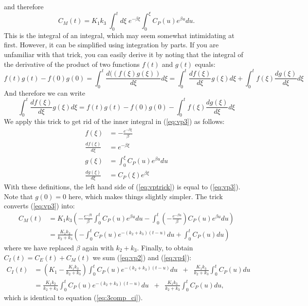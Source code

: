 \documentclass[11pt,oneside]{article}
\begin{document}
and therefore
\begin{equation}
  C_M(t) = K_1 k_3 \; \int_0^t d\xi \; e^{-\beta \xi} 
       \int_0^\xi  C_P(u) e^{\beta u} du.   \label{eq:vp3}
\end{equation}
This is the integral of an integral, which may seem somewhat
intimidating at first. However, it can be simplified using integration
by parts. If you are unfamiliar with that trick, you can easily derive
it by noting that the integral of the derivative of the product of two
functions $f(t)$ and $g(t)$ equals:
\begin{equation}
  f(t) g(t) - f(0) g(0) = \int_0^t \frac{d ((f(\xi) g(\xi))}{d\xi} d\xi
 = \int_0^t \frac{d f(\xi)}{d\xi} g(\xi) d\xi 
   +  \int_0^t f(\xi) \frac{d g(\xi)}{d\xi} d\xi
\end{equation}
And therefore we can write
\begin{equation}
  \int_0^t \frac{d f(\xi)}{d\xi} g(\xi) d\xi = f(t) g(t) - f(0) g(0)
        - \int_0^t f(\xi) \frac{d g(\xi)}{d\xi} d\xi \label{eq:vptrick}
\end{equation}
We apply this trick to get rid of the inner integral in (\ref{eq:vp3})
as follows:
\begin{align}
  f(\xi) &= -\frac{e^{-\beta \xi}}{\beta}\\
  \frac{d f(\xi)}{d\xi} &= e^{-\beta\xi}\\
  g(\xi) &= \int_0^\xi  C_P(u) e^{\beta u} du\\
  \frac{d g(\xi)}{d\xi} &= C_P(\xi) e^{\beta \xi}
\end{align}
With these definitions, the left hand side of (\ref{eq:vptrick}) is
equal to (\ref{eq:vp3}). Note that $g(0) = 0$ here, which makes things
slightly simpler.  The trick converts (\ref{eq:vp3}) into:
\begin{align}
 C_M(t) &= K_1 k_3 \left( 
  -\frac{e^{-\beta t}}{\beta} \int_0^t  C_P(u) e^{\beta u} du
  - \int_0^t (-\frac{e^{-\beta u}}{\beta}) C_P(u) e^{\beta u} du
   \right) \nonumber \\
 &= \frac{K_1 k_3}{k_2 + k_3} \left(
   - \int_0^t C_P(u) e^{-(k_2 + k_3) (t -u)} du + \int_0^t C_P(u) du
 \right) \label{eq:vp4}
\end{align}
where we have replaced $\beta$ again with $k_2 + k_3$.
Finally, to obtain $C_I(t) = C_E(t) + C_M(t)$ we sum (\ref{eq:vp2})
and (\ref{eq:vp4}):
\begin{align}
C_I(t) &= (K_1 - \frac{K_1 k_3}{k_2 + k_3}) 
            \int_0^t C_P(u) e^{- (k_2 + k_3) (t -u)} du \;\;
       + \;\; \frac{K_1 k_3}{k_2 + k_3} \int_0^t C_P(u) du \nonumber\\
 &=
  \frac{K_1 k_2}{k_2 + k_3} \int_0^t C_P(u) e^{- (k_2 + k_3) (t -u)} du
    \;\; + \;\;
   \frac{K_1 k_3}{k_2 + k_3} \int_0^t C_P(u) du,
\end{align}
which is identical to equation (\ref{eq:3comp_ci}).
\end{document}
